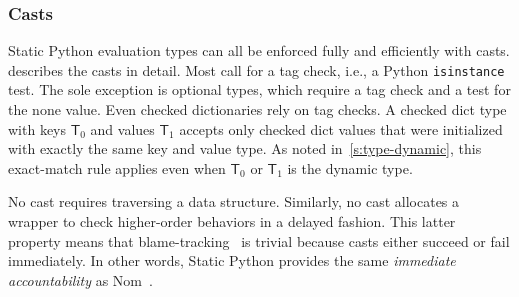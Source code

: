 \documentclass[english,cleveref,submission]{programming}
\newcommand{\SP}{Static Python}
\newcommand{\code}[1]{\texttt{#1}}
\newcommand{\typefont}[1]{\mathsf{#1}}
\newcommand{\spteval}{\typefont{T}}
\begin{document}
\subsubsection{Casts}

\SP{} evaluation types can all be enforced fully and efficiently
with casts.
 describes the casts in detail.
Most call for a tag check, i.e., a Python \code{isinstance} test.
The sole exception is optional types, which require a tag check and a test for the none value.
Even checked dictionaries rely on tag checks.
A checked dict type with keys $\spteval_0$ and values $\spteval_1$ accepts only
checked dict values that were initialized with exactly the same key and value type.
As noted in~\cref{s:type-dynamic}, this exact-match rule applies even when $\spteval_0$
or $\spteval_1$ is the dynamic type.

No cast requires traversing a data structure.
Similarly, no cast allocates a wrapper to check higher-order behaviors in a delayed fashion.
This latter property means that blame-tracking~\cite{ff-icfp-2002} is trivial because
casts either succeed or fail immediately.
In other words, \SP{} provides the same \emph{immediate accountability} as
Nom~\cite{mt-oopsla-2017}.

\end{document}
